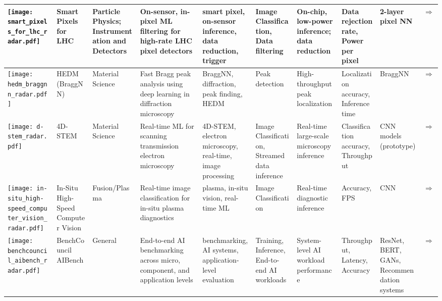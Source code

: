 \begin{landscape}
{\begin{longtable}{|p{}|p{}|p{}|p{}|p{}|p{}|p{}|p{}|p{}|p{}|}
\texttt{[image: smart\_pixels\_for\_lhc\_radar.pdf]} & Smart Pixels for LHC & Particle Physics; Instrumentation and Detectors & On-sensor, in-pixel ML filtering for high-rate LHC pixel detectors & smart pixel, on-sensor inference, data reduction, trigger & Image Classification, Data filtering & On-chip, low-power inference; data reduction & Data rejection rate, Power per pixel & 2-layer pixel NN & \cite{parpillon2024smartpixelsinpixelai}\href{https://arxiv.org/abs/2406.14860}{$\Rightarrow$} \\ \hline
\texttt{[image: hedm\_braggnn\_radar.pdf]} & HEDM (BraggNN) & Material Science & Fast Bragg peak analysis using deep learning in diffraction microscopy & BraggNN, diffraction, peak finding, HEDM & Peak detection & High-throughput peak localization & Localization accuracy, Inference time & BraggNN & \cite{liu2021braggnnfastxraybragg}\href{https://arxiv.org/abs/2008.08198}{$\Rightarrow$} \\ \hline
\texttt{[image: d-stem\_radar.pdf]} & 4D-STEM & Material Science & Real-time ML for scanning transmission electron microscopy & 4D-STEM, electron microscopy, real-time, image processing & Image Classification, Streamed data inference & Real-time large-scale microscopy inference & Classification accuracy, Throughput & CNN models (prototype) & \cite{qin2023extremely}\href{https://openreview.net/pdf?id=7yt3N0o0W9}{$\Rightarrow$} \\ \hline
\texttt{[image: in-situ\_high-speed\_computer\_vision\_radar.pdf]} & In-Situ High-Speed Computer Vision & Fusion/Plasma & Real-time image classification for in-situ plasma diagnostics & plasma, in-situ vision, real-time ML & Image Classification & Real-time diagnostic inference & Accuracy, FPS & CNN & \cite{wei2024lowlatencyopticalbasedmode}\href{https://arxiv.org/abs/2312.00128}{$\Rightarrow$} \\ \hline
\texttt{[image: benchcouncil\_aibench\_radar.pdf]} & BenchCouncil AIBench & General & End-to-end AI benchmarking across micro, component, and application levels & benchmarking, AI systems, application-level evaluation & Training, Inference, End-to-end AI workloads & System-level AI workload performance & Throughput, Latency, Accuracy & ResNet, BERT, GANs, Recommendation systems & \cite{gao2019aibenchindustrystandardinternet}\href{https://www.benchcouncil.org/AIBench/}{$\Rightarrow$} \\ \hline

\end{longtable}}
\end{landscape}

